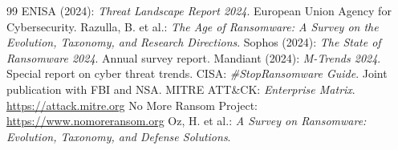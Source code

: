 \documentclass[12pt,a4paper]{article}
\begin{document}
\begin{thebibliography}{99}
   ENISA (2024): \textit{Threat Landscape Report 2024}. European Union Agency for Cybersecurity.
   Razulla, B. et al.: \textit{The Age of Ransomware: A Survey on the Evolution, Taxonomy, and Research Directions}.
   Sophos (2024): \textit{The State of Ransomware 2024}. Annual survey report.
   Mandiant (2024): \textit{M-Trends 2024}. Special report on cyber threat trends.
   CISA: \textit{\#StopRansomware Guide}. Joint publication with FBI and NSA.
   MITRE ATT\&CK: \textit{Enterprise Matrix}. \url{https://attack.mitre.org}
   No More Ransom Project: \url{https://www.nomoreransom.org}
   Oz, H. et al.: \textit{A Survey on Ransomware: Evolution, Taxonomy, and Defense Solutions}.
\end{thebibliography}
\end{document}
